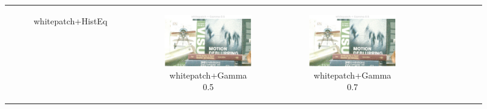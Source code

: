 \documentclass[11pt, a4]{article}
\begin{document}
\begin{enumerate}
\begin{figure}[h]
{\begin{tabular}{cccc}
\begin{subfigure}[h]{0.45\linewidth}
							\caption{whitepatch+HistEq}
							\label{fig:RawImage1_tone_5}
						\end{subfigure} &
						\begin{subfigure}[h]{0.45\linewidth}
							\centering
							\includegraphics[width=\linewidth]{../output/RawImage1_Tone_whitepatch_Gamma0.5.pdf}
							\caption{whitepatch+Gamma 0.5}
							\label{fig:RawImage1_tone_6}
						\end{subfigure} &
						\begin{subfigure}[h]{0.45\linewidth}
							\centering
							\includegraphics[width=\linewidth]{../output/RawImage1_Tone_whitepatch_Gamma0.5.pdf}
							\caption{whitepatch+Gamma 0.7}
							\label{fig:RawImage1_tone_7}
						\end{subfigure} &
						\begin{subfigure}[h]{0.45\linewidth}
							\centering

\end{subfigure}
\end{tabular}}
\end{figure}
\end{enumerate}
\end{document}
